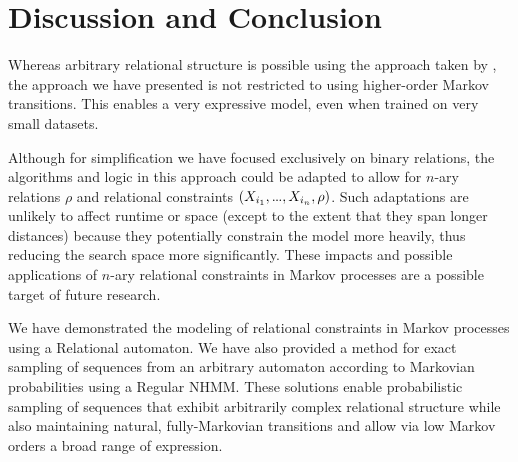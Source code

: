 \documentclass[phd,electronic,oneside,twosidetoc,letterpaper,chaptercenter,parttop,lol,lof,lot]{byumsphd}
\newcommand\mydots{\hbox to .75em{.\hss.\hss.}}
\begin{document}
%
%
%
%

\section{Discussion and Conclusion}

Whereas arbitrary relational structure is possible using the approach taken by \cite{bodily2018floating}, the approach we have presented is not restricted to using higher-order Markov transitions. This enables a very expressive model, even when trained on very small datasets. 

Although for simplification we have focused exclusively on binary relations, the algorithms and logic in this approach could be adapted to allow for $n$-ary relations $\rho$ and relational constraints $(X_{i_1},\mydots,X_{i_n},\rho)$. Such adaptations are unlikely to affect runtime or space (except to the extent that they span longer distances) because they potentially constrain the model more heavily, thus reducing the search space more significantly. These impacts and possible applications of $n$-ary relational constraints in Markov processes are a possible target of future research.

We have demonstrated the modeling of relational constraints in Markov processes using a {\sc Relational} automaton. We have also provided a method for exact sampling of sequences from an arbitrary automaton according to Markovian probabilities using a {\sc Regular} NHMM. These solutions enable probabilistic sampling of sequences that exhibit arbitrarily complex relational structure while also maintaining natural, fully-Markovian transitions and allow via low Markov orders a broad range of expression.
\end{document}
